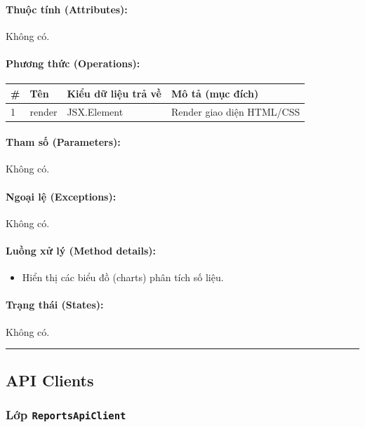 \documentclass[12pt,a4paper]{article}
\begin{document}
\paragraph{Thuộc tính (Attributes):}
Không có.

\paragraph{Phương thức (Operations):}
\begin{longtable}{|p{0.6cm}|p{5.0cm}|p{2.8cm}|p{5.4cm}|}
\hline
\textbf{\#} & \textbf{Tên} & \textbf{Kiểu dữ liệu trả về} & \textbf{Mô tả (mục đích)} \\ \hline
\endhead
1 & render & JSX.Element & Render giao diện HTML/CSS \\ \hline
\end{longtable}

\paragraph{Tham số (Parameters):}
Không có.

\paragraph{Ngoại lệ (Exceptions):}
Không có.

\paragraph{Luồng xử lý (Method details):}
\begin{itemize}[leftmargin=*]
    \item Hiển thị các biểu đồ (charts) phân tích số liệu.
\end{itemize}


\paragraph{Trạng thái (States):}
Không có.

\vskip 0.5cm
\noindent\rule{\textwidth}{0.5pt}
\vskip 0.5cm

\subsection{API Clients}


\subsubsection{Lớp \texttt{ReportsApiClient}}
\end{document}
